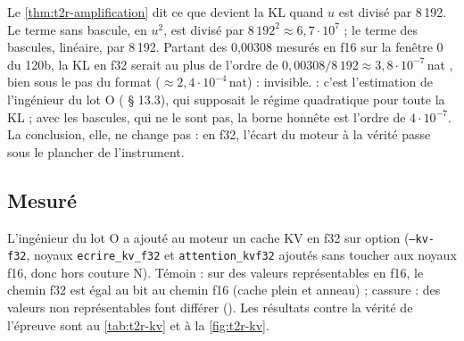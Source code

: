 Le \cref{thm:t2r-amplification} dit ce que devient la KL quand $u$ est divisé par 8\,192. Le terme sans bascule, en $u^2$, est divisé par $8\,192^2 \approx 6{,}7\cdot10^7$ ; le terme des bascules, linéaire, par 8\,192. Partant des 0,00308 mesurés en f16 sur la fenêtre 0 du 120b, la KL en f32 serait au plus de l'ordre de $0{,}00308/8\,192 \approx 3{,}8\cdot10^{-7}$\,nat \calc, bien sous le pas du format ($\approx 2{,}4\cdot10^{-4}$\,nat) : invisible.  : c'est l'estimation de l'ingénieur du lot O ( § 13.3), qui supposait le régime quadratique pour toute la KL ; avec les bascules, qui ne le sont pas, la borne honnête est l'ordre de $4\cdot10^{-7}$. La conclusion, elle, ne change pas : en f32, l'écart du moteur à la vérité passe sous le plancher de l'instrument.

\subsection{Mesuré}\label{sec:t2r-f32-mesure}

L'ingénieur du lot O a ajouté au moteur un cache KV en f32 sur option (\texttt{--kv-f32}, noyaux \texttt{ecrire\_kv\_f32} et \texttt{attention\_kvf32} ajoutés sans toucher aux noyaux f16, donc hors couture N). Témoin : sur des valeurs représentables en f16, le chemin f32 est égal au bit au chemin f16 (cache plein et anneau) ; cassure : des valeurs non représentables font différer (). Les résultats contre la vérité de l'épreuve sont au \cref{tab:t2r-kv} et à la \cref{fig:t2r-kv}.

